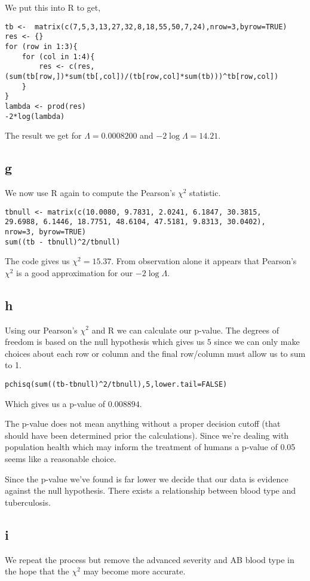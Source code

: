 \documentclass{article}
\begin{document}
We put this into R to get,
\begin{verbatim}
tb <-  matrix(c(7,5,3,13,27,32,8,18,55,50,7,24),nrow=3,byrow=TRUE)
res <- {}
for (row in 1:3){
    for (col in 1:4){
        res <- c(res, (sum(tb[row,])*sum(tb[,col])/(tb[row,col]*sum(tb)))^tb[row,col])
    }
}
lambda <- prod(res)
-2*log(lambda)
\end{verbatim}

The result we get for $\Lambda = 0.0008200$ and $-2\log\Lambda = 14.21$.

\subsection{g}
We now use R again to compute the Pearson's $\chi^2$ statistic.
\begin{verbatim}
tbnull <- matrix(c(10.0080, 9.7831, 2.0241, 6.1847, 30.3815,
29.6988, 6.1446, 18.7751, 48.6104, 47.5181, 9.8313, 30.0402),
nrow=3, byrow=TRUE)
sum((tb - tbnull)^2/tbnull)
\end{verbatim}

The code gives us $\chi^2 = 15.37$. From observation alone it appears that
Pearson's $\chi^2$ is a good approximation for our $-2\log\Lambda$.

\subsection{h}
Using our Pearson's $\chi^2$ and R we can calculate our p-value.
The degrees of freedom is based on the null hypothesis which gives us $5$ since
we can only make choices about each row or column and the final row/column must
allow us to sum to 1.
\begin{verbatim}
pchisq(sum((tb-tbnull)^2/tbnull),5,lower.tail=FALSE)
\end{verbatim}

Which gives us a p-value of $0.008894$.

The p-value does not mean anything without a proper decision cutoff
(that should have been determined prior the calculations). Since we're
dealing with population health which may inform the treatment of humans a
p-value of 0.05 seems like a reasonable choice.

Since the p-value we've found is far lower we decide that our data is evidence
against the null hypothesis. There exists a relationship between
blood type and tuberculosis.

\subsection{i}
We repeat the process but remove the advanced severity and AB blood type in the
hope that the $\chi^2$ may become more accurate.
\end{document}

